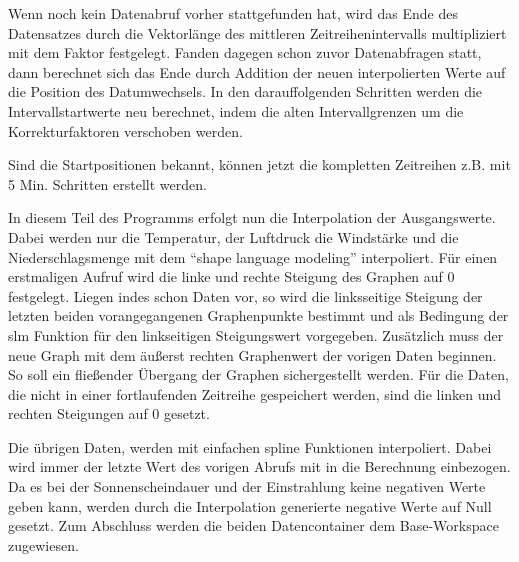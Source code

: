 
Wenn noch kein Datenabruf vorher stattgefunden hat, wird das Ende des Datensatzes durch die Vektorlänge des mittleren Zeitreihenintervalls multipliziert mit dem Faktor festgelegt. Fanden dagegen schon zuvor Datenabfragen statt, dann berechnet sich das Ende durch Addition der neuen interpolierten Werte auf die Position des Datumwechsels. In den darauffolgenden Schritten werden die Intervallstartwerte neu berechnet, indem die alten Intervallgrenzen um die Korrekturfaktoren verschoben werden.       

Sind die Startpositionen bekannt, können jetzt die kompletten Zeitreihen z.B. mit 5 Min. Schritten erstellt werden.

In diesem Teil des Programms erfolgt nun die Interpolation der Ausgangswerte. Dabei werden nur die Temperatur, der Luftdruck die Windstärke und die Niederschlagsmenge mit dem \enquote{shape language modeling} \cite{SLM} interpoliert. Für einen erstmaligen Aufruf wird die linke und rechte Steigung des Graphen auf 0 festgelegt. Liegen indes schon Daten vor, so wird die linksseitige Steigung der letzten beiden vorangegangenen Graphenpunkte bestimmt und als Bedingung der \textsf{slm} Funktion für den linkseitigen Steigungswert vorgegeben. Zusätzlich muss der neue Graph mit dem äußerst rechten Graphenwert der vorigen Daten beginnen. So soll ein fließender Übergang der Graphen sichergestellt werden. Für die Daten, die nicht in einer fortlaufenden Zeitreihe gespeichert werden, sind die linken und rechten Steigungen auf 0 gesetzt.   
 
Die übrigen Daten, werden mit einfachen \textsf{spline} Funktionen interpoliert. Dabei wird immer der letzte Wert des vorigen Abrufs mit in die Berechnung einbezogen. Da es bei der Sonnenscheindauer und der Einstrahlung keine negativen Werte geben kann, werden durch die Interpolation generierte negative Werte auf Null gesetzt. Zum Abschluss werden die beiden Datencontainer dem Base-Workspace zugewiesen.    

